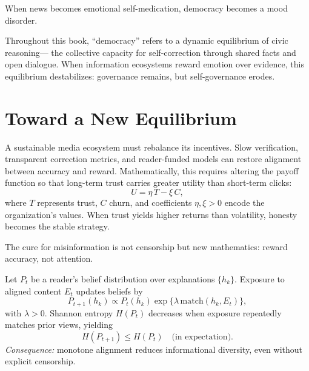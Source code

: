 \documentclass[12pt,twoside]{book}
\begin{document}
\begin{keyidea}
When news becomes emotional self-medication, democracy becomes a mood disorder.
\end{keyidea}

\begin{tcolorbox}[colback=gray!5,colframe=gray!60,boxrule=0.4pt,arc=1mm,
title={Clarification}]
Throughout this book, “democracy” refers to a dynamic equilibrium of civic reasoning—
the collective capacity for self-correction through shared facts and open dialogue.
When information ecosystems reward emotion over evidence, this equilibrium destabilizes:
governance remains, but self-governance erodes.
\end{tcolorbox}


\section{Toward a New Equilibrium}

A sustainable media ecosystem must rebalance its incentives.  
Slow verification, transparent correction metrics, and reader-funded models can restore alignment between accuracy and reward.  
Mathematically, this requires altering the payoff function so that long-term trust carries greater utility than short-term clicks:
\[
U = \eta\,T - \xi\,C,
\]
where \(T\) represents trust, \(C\) churn, and coefficients \(\eta,\xi>0\) encode the organization’s values.  
When trust yields higher returns than volatility, honesty becomes the stable strategy.

\begin{keyidea}
The cure for misinformation is not censorship but new mathematics: reward accuracy, not attention.
\end{keyidea}

\begin{tcolorbox}[colback=gray!5,colframe=gray!60,boxrule=0.4pt,arc=1mm,
title=Mathematical Interlude: Confirmation Drift via Entropy Loss]
Let $P_t$ be a reader’s belief distribution over explanations $\{h_k\}$.  
Exposure to aligned content $E_t$ updates beliefs by
\[
P_{t+1}(h_k)\propto P_t(h_k)\exp\{\lambda\,\text{match}(h_k,E_t)\},
\]
with $\lambda>0$.  
Shannon entropy $H(P_t)$ decreases when exposure repeatedly matches prior views, yielding
\[
H(P_{t+1}) \le H(P_t)\quad\text{(in expectation)}.
\]
\textit{Consequence:} monotone alignment reduces informational diversity, even without explicit censorship.
\end{tcolorbox}
\end{document}
